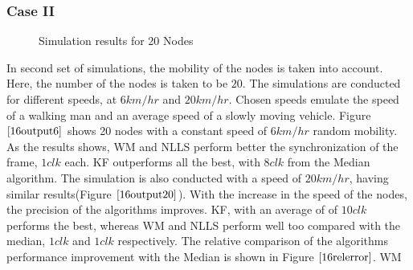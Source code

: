 \documentclass[journal]{IEEEtran}
\begin{document}
\subsubsection{\textbf{Case II}}
\begin{figure}
\centerline{
 \hfil {}} \caption{Simulation results for 20 Nodes}
\label{16output}
\end{figure}
In second set of simulations, the mobility of the nodes is taken
into account. Here, the number of the nodes is taken to be $20$. The
simulations are conducted for different speeds, at $6km/hr$ and
$20km/hr$. Chosen speeds emulate the speed of a walking man and an
average speed of a slowly moving vehicle. \newline Figure
$\ref{16output6}$ shows 20 nodes with a constant speed of $6km/hr$
random mobility. As the results shows, WM and NLLS perform better
the synchronization of the frame, $1 clk$ each. KF outperforms all
the best, with $8 clk$ from the Median algorithm. \newline The
simulation is also conducted with a speed of $20km/hr$, having
similar results(Figure $\ref{16output20}$). With the increase in the
speed of the nodes, the precision of the algorithms improves. KF,
with an average of of $10 clk$ performs the best, whereas WM and
NLLS perform well too compared with the median, $1 clk$ and $1 clk$
respectively. \newline 
The relative comparison of the algorithms performance improvement with the Median is shown in Figure $\ref{16relerror}$. WM
\end{document}
